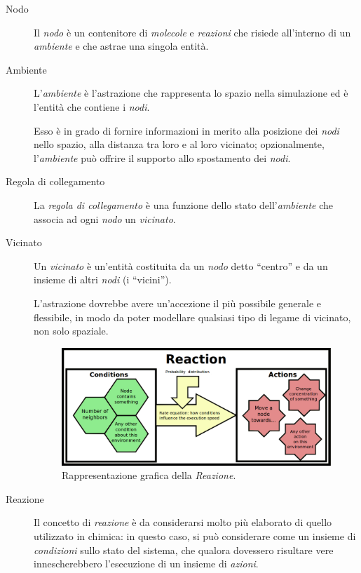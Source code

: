 \begin{description}
      \item[Nodo]\label{itm:node}
        Il \emph{nodo} è un contenitore di \emph{molecole} e \emph{reazioni} che risiede all'interno di un \emph{ambiente} e che astrae una singola entità.

      \item[Ambiente]\label{itm:env}
        L'\emph{ambiente} è l'astrazione che rappresenta lo spazio nella simulazione ed è l'entità che contiene i \emph{nodi}.

        Esso è in grado di fornire informazioni in merito alla posizione dei \emph{nodi} nello spazio, alla distanza tra loro e al loro vicinato;
        opzionalmente, l'\emph{ambiente} può offrire il supporto allo spostamento dei \emph{nodi}.

      \item[Regola di collegamento]\label{itm:linkr}
        La \emph{regola di collegamento} è una funzione dello stato dell'\emph{ambiente} che associa ad ogni \emph{nodo} un \emph{vicinato}.

      \item[Vicinato]\label{itm:neigh}
        Un \emph{vicinato} è un'entità costituita da un \emph{nodo} detto ``centro'' e da un insieme di altri \emph{nodi} (i ``vicini'').

        L'astrazione dovrebbe avere un'accezione il più possibile generale e flessibile, in modo da poter modellare qualsiasi tipo di legame di vicinato, non solo spaziale.

        \begin{figure}[htbp]
          \centering
          \includegraphics[width=.85\textwidth]{res/fig/alchemist_reaction.png}
          \caption{Rappresentazione grafica della \emph{Reazione}.}%
          \label{fig:alchemist:reaction}
        \end{figure}

      \item[Reazione]\label{itm:react}
        Il concetto di \emph{reazione} è da considerarsi molto più elaborato di quello utilizzato in chimica:
        in questo caso, si può considerare come un insieme di \emph{condizioni} sullo stato del sistema, che qualora dovessero risultare vere innescherebbero l'esecuzione di un insieme di \emph{azioni}.


\end{description}
